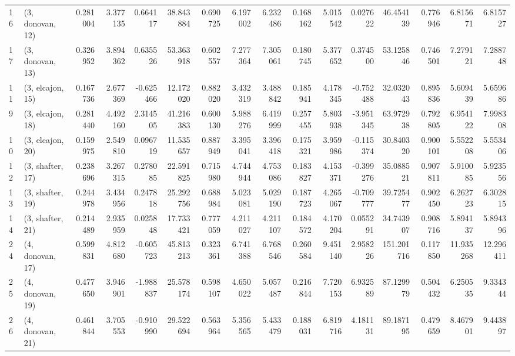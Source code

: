 \begin{tabular}{llrrrrrrrrrrrrrr}
16 &  (3, donovan, 12) &   0.281004 &  3.377135 &  0.664117 &   38.843884 &  0.690725 &   6.197002 &   6.232486 &  0.168162 &  5.015542 &  0.027622 &   46.454139 &  0.776946 &   6.815671 &   6.815727 \\
17 &  (3, donovan, 13) &   0.326952 &  3.894362 &  0.635526 &   53.363918 &  0.602557 &   7.277364 &   7.305061 &  0.180745 &  5.377652 &  0.374500 &   53.125846 &  0.746501 &   7.279121 &   7.288748 \\
11 &  (3, elcajon, 15) &   0.167736 &  2.677369 & -0.625466 &   12.172020 &  0.882020 &   3.432319 &   3.488842 &  0.185941 &  4.178345 & -0.752488 &   32.032043 &  0.895836 &   5.609439 &   5.659686 \\
9  &  (3, elcajon, 18) &   0.281440 &  4.492160 &  2.314505 &   41.216383 &  0.600130 &   5.988276 &   6.419999 &  0.257455 &  5.803938 & -3.951345 &   63.972938 &  0.792805 &   6.954122 &   7.998308 \\
10 &  (3, elcajon, 20) &   0.159975 &  2.549810 &  0.096719 &   11.535657 &  0.887949 &   3.395041 &   3.396418 &  0.175321 &  3.959986 & -0.115374 &   30.840320 &  0.900101 &   5.552208 &   5.553406 \\
12 &  (3, shafter, 17) &   0.238696 &  3.267315 &  0.278085 &   22.591825 &  0.715980 &   4.744944 &   4.753086 &  0.183827 &  4.153371 & -0.399276 &   35.088521 &  0.907811 &   5.910085 &   5.923556 \\
13 &  (3, shafter, 19) &   0.244978 &  3.434956 &  0.247818 &   25.292756 &  0.688984 &   5.023081 &   5.029190 &  0.187723 &  4.265067 & -0.709777 &   39.725477 &  0.902450 &   6.262723 &   6.302815 \\
14 &  (3, shafter, 21) &   0.214489 &  2.935959 &  0.025848 &   17.733421 &  0.777059 &   4.211027 &   4.211107 &  0.184572 &  4.170204 &  0.055291 &   34.743907 &  0.908716 &   5.894137 &   5.894396 \\
24 &  (4, donovan, 17) &   0.599831 &  4.812680 & -0.605723 &   45.813213 &  0.323361 &   6.741388 &   6.768546 &  0.260584 &  9.451140 &  2.958226 &  151.201716 &  0.117850 &  11.935268 &  12.296411 \\
25 &  (4, donovan, 19) &   0.477650 &  3.946901 & -1.988837 &   25.578174 &  0.598107 &   4.650022 &   5.057487 &  0.216844 &  7.720153 &  6.932589 &   87.129979 &  0.504432 &   6.250535 &   9.334344 \\
26 &  (4, donovan, 21) &   0.461844 &  3.705553 & -0.910990 &   29.522694 &  0.563964 &   5.356565 &   5.433479 &  0.188031 &  6.819716 &  4.181131 &   89.187195 &  0.479659 &   8.467901 &   9.443897 \\

\end{tabular}
